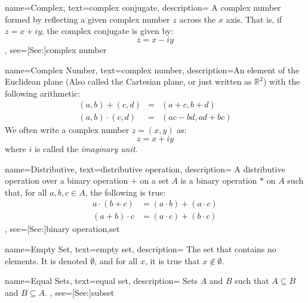 {
    name={Complex},
    text={complex conjugate},
    description={
        A complex number formed by reflecting a given complex number $z$
        across the $x$ axis. That is, if $z=x+iy$, the complex
        conjugate is given by:
        \begin{equation*}
            \overline{z}=x-iy
        \end{equation*}
    },
    see=[See:]{complex number}
}

{
    name={Complex Number},
    text={complex number},
    description={An element of the Euclidean plane (Also called the
                 Cartesian plane, or just written as $\mathbb{R}^{2}$)
                 with the following arithmetic:
                 \begin{eqnarray*}
                     (a,b)+(c,d)
                     \!&\!=\!&\!(a+c,b+d)\\
                     (a,b)\cdot(c,d)
                     \!&\!=\!&\!(ac-bd,ad+bc)
                 \end{eqnarray*}
                 We often write a complex number $z=(x,y)$ as:
                 \begin{equation*}
                     z=x+iy
                 \end{equation*}
                 where $i$ is called the \textit{imaginary unit}.
                }
}

{
    name={Distributive},
    text={distributive operation},
    description={
        A distributive operation over a binary operation $+$ on a set
        $A$ is a binary operation $*$ on $A$ such that, for all
        $a,b,c\in{A}$, the following is true:
        {%
            \begin{align}
                a\cdot(b+c)&=(a\cdot{b})+(a\cdot{c})\\
                (a+b)\cdot{c}&=(a\cdot{c})+(b\cdot{c})
            \end{align}
        }%
    },
    see=[See:]{binary operation,set}
}

{
    name={Empty Set},
    text={empty set},
    description={
        The set that contains no elements. It is denoted $\emptyset$, and
        for all $x$, it is true that $x\notin\emptyset$.
    }
}

{
    name={Equal Sets},
    text={equal set},
    description={
        Sets $A$ and $B$ such that $A\subseteq{B}$ and $B\subseteq{A}$.
    },
    see=[See:]{subset}
}

